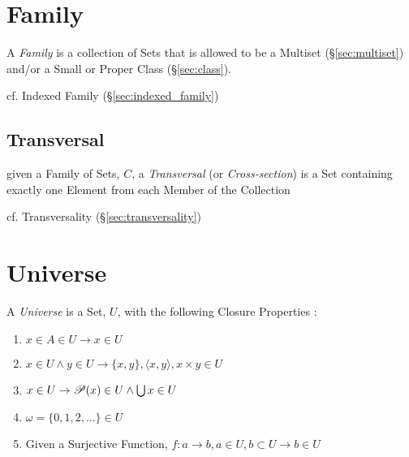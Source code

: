 \section{Family}\label{sec:family}

A \emph{Family} is a collection of Sets that is allowed to be a Multiset
(\S\ref{sec:multiset}) and/or a Small or Proper Class (\S\ref{sec:class}).

\fist cf. Indexed Family (\S\ref{sec:indexed_family})



\subsection{Transversal}\label{sec:transversal}

given a Family of Sets, $C$, a \emph{Transversal} (or \emph{Cross-section}) is a
Set containing exactly one Element from each Member of the Collection

cf. Transversality (\S\ref{sec:transversality})



\section{Universe}\label{sec:set_universe}

A \emph{Universe} is a Set, $U$, with the following Closure Properties
\cite{maclane69}:
\begin{enumerate}
\item $x \in A \in U \to x \in U$
\item $x \in U \wedge y \in U \to \{x,y\}, \langle x,y
  \rangle, x \times y \in U$
\item $x \in U \to \mathscr{P}(x) \in U \wedge \bigcup x \in U$
\item $\omega = \{0,1,2,\ldots\} \in U$
\item Given a Surjective Function, $f : a \to b, a \in
  U, b \subset U \to b \in U$
\end{enumerate}

